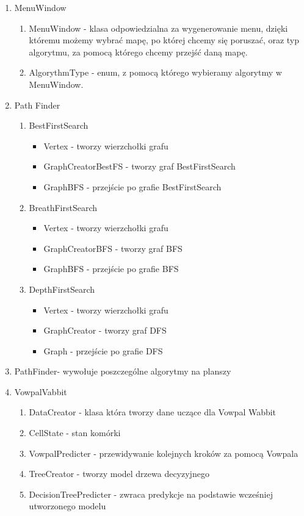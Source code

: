 \documentclass[12pt]{article}
\begin{document}
\begin{enumerate}
	\item MenuWindow
    		\begin{enumerate}[label=(\roman*)]
		\item MenuWindow - klasa odpowiedzialna za wygenerowanie menu, dzięki któremu możemy wybrać mapę, po której chcemy się poruszać, oraz typ algorytmu, za pomocą którego chcemy przejść daną mapę.
		\item AlgorythmType - enum, z pomocą którego wybieramy algorytmy w MenuWindow.
		\end{enumerate}
	\item Path Finder
    		\begin{enumerate}[label=(\roman*)]
		\item BestFirstSearch
			\begin{itemize}
			\item Vertex - tworzy wierzchołki grafu
			\item GraphCreatorBestFS - tworzy graf BestFirstSearch
			\item GraphBFS - przejście po grafie BestFirstSearch
			\end{itemize}
		\item BreathFirstSearch
			\begin{itemize}
			\item Vertex - tworzy wierzchołki grafu
			\item GraphCreatorBFS - tworzy graf BFS
			\item GraphBFS - przejście po grafie BFS
			\end{itemize}
		\item DepthFirstSearch
			\begin{itemize}
			\item Vertex - tworzy wierzchołki grafu
			\item GraphCreator - tworzy graf DFS
			\item Graph - przejście po grafie DFS
			\end{itemize}
		\end{enumerate}
	\item PathFinder- wywołuje poszczególne algorytmy na planszy
	\item VowpalVabbit
		\begin{enumerate}[label=(\roman*)]
		\item DataCreator - klasa która tworzy dane uczące dla Vowpal Wabbit
		\item CellState - stan komórki
		\item VowpalPredicter - przewidywanie kolejnych kroków za pomocą Vowpala
		\item TreeCreator - tworzy model drzewa decyzyjnego 
		\item DecisionTreePredicter - zwraca predykcje na podstawie wcześniej utworzonego modelu
		\end{enumerate}
\end{enumerate}
\newpage 
\end{document}
